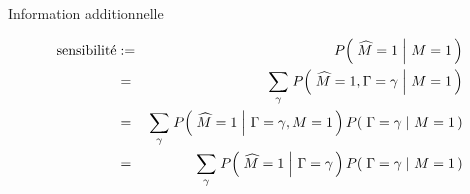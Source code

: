 
\newcommand{\pot}{{\color{red}p^{(1)}_{2}}}

\newcommand{\ptz}{{\color{blue}p^{(2)}_{0}}}
\newcommand{\pto}{{\color{blue}p^{(2)}_{1}}}

\newcommand{\phz}{{\color{green}p^{(3)}_{0}}}
\newcommand{\pho}{{\color{green}p^{(3)}_{1}}}

\newcommand{\pozz}{{\color{red}p^{(1)}_{0|0}}}
\newcommand{\pooz}{{\color{red}p^{(1)}_{1|0}}}

\newcommand{\ptzz}{{\color{blue}p^{(2)}_{0|0}}}
\newcommand{\ptoz}{{\color{blue}p^{(2)}_{1|0}}}

\newcommand{\phzz}{{\color{green}p^{(3)}_{0|0}}}
\newcommand{\phoz}{{\color{green}p^{(3)}_{1|0}}}

\newcommand{\pozo}{{\color{pink}p^{(1)}_{0|1}}}
\newcommand{\pooo}{{\color{pink}p^{(1)}_{1|1}}}

\newcommand{\ptzo}{{\color{cyan}p^{(2)}_{0|1}}}
\newcommand{\ptoo}{{\color{cyan}p^{(2)}_{1|1}}}

\newcommand{\phzo}{{\color{lime}p^{(3)}_{0|1}}}
\newcommand{\phoo}{{\color{lime}p^{(3)}_{1|1}}}

\newcommand{\pzz}{{\color{pink}p_{0\vert0}}}
\newcommand{\poz}{{\color{pink}p_{1\vert0}}}
\newcommand{\qzz}{{\color{cyan}q_{0\vert0}}}
\newcommand{\qoz}{{\color{cyan}q_{1\vert0}}}
\newcommand{\rzz}{{\color{green}r_{0\vert0}}}
\newcommand{\roz}{{\color{green}r_{1\vert0}}}

\newcommand{\pzo}{{\color{red}p_{0\vert1}}}
\newcommand{\poo}{{\color{red}p_{1\vert 1}}}
\newcommand{\qzo}{{\color{blue}q_{0\vert1}}}
\newcommand{\qoo}{{\color{blue}q_{1\vert1}}}
\newcommand{\rzo}{{\color{deepGreen}r_{0\vert1}}}
\newcommand{\roo}{{\color{deepGreen}r_{1\vert1}}}

\begin{frame}{\vskip -0.2cm \LARGE Information additionnelle}

\begin{eqnarray*}
\textnormal{sensibilit\'e}
&:=&
	P\!\left(\,\left.\widehat{M}=1\;\right\vert\,M=1\,\right)
\\
&=&
	\underset{\gamma}{\sum}\;P\!\left(\,\left.\widehat{M}=1,\Gamma=\gamma\;\right\vert\,M=1\,\right)
\\
&=&
	\underset{\gamma}{\sum}\;
	P\!\left(\,\left.\widehat{M}=1\;\right\vert\,\Gamma=\gamma,M=1\,\right)
	P\!\left(\,\left.\Gamma=\gamma\;\right\vert\,M=1\,\right)
\\
&=&
	\underset{\gamma}{\sum}\;
	P\!\left(\,\left.\widehat{M}=1\;\right\vert\,\Gamma=\gamma\,\right)
	P\!\left(\,\left.\Gamma=\gamma\;\right\vert\,M=1\,\right)
\\
\end{eqnarray*}

\end{frame}
\normalsize

